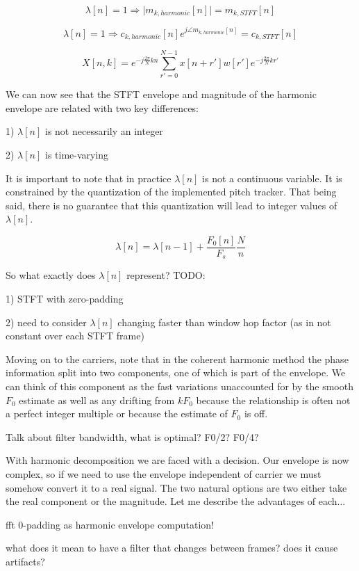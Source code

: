 \documentclass [11pt, proquest] {uwthesis}[2015/03/03]
\begin{document}
$$\lambda[n] = 1 \Rightarrow \vert m_{k,harmonic}[n] \vert = m_{k,STFT}[n]$$

$$\lambda[n] = 1 \Rightarrow c_{k,harmonic}[n]e^{j \angle m_{k,harmonic}[n]} = c_{k,STFT}[n]$$



$$X[n,k] = e^{-j\frac{2\pi}{N}kn} \sum\limits_{r'=0}^{N-1} x[n + r'] w[r'] e^{-j\frac{2\pi}{N}kr'}$$


We can now see that the STFT envelope and magnitude of the harmonic envelope are related with two key differences:

1) $\lambda[n]$ is not necessarily an integer

2) $\lambda[n]$ is time-varying

It is important to note that in practice $\lambda[n]$ is not a continuous variable.  It is constrained by the quantization of the implemented pitch tracker.  That being said, there is no guarantee that this quantization will lead to integer values of $\lambda[n]$.

$$\lambda[n] = \lambda[n-1] + \frac{F_0[n]}{F_s}  \frac{N}{n}$$

So what exactly does $\lambda[n]$ represent?  TODO: 

1) STFT with zero-padding

2) need to consider $\lambda[n]$ changing faster than window hop factor (as in not constant over each STFT frame)

Moving on to the carriers, note that in the coherent harmonic method the phase information split into two components, one of which is part of the envelope.  We can think of this component as the fast variations unaccounted for by the smooth $F_0$ estimate as well as any drifting from $kF_0$ because the relationship is often not a perfect integer multiple or because the estimate of $F_0$ is off.


Talk about filter bandwidth, what is optimal? F0/2? F0/4?


With harmonic decomposition we are faced with a decision.  Our envelope is now complex, so if we need to use the envelope independent of carrier we must somehow convert it to a real signal.  The two natural options are two either take the real component or the magnitude.  Let me describe the advantages of each...


fft 0-padding as harmonic envelope computation!

		what does it mean to have a filter that changes
		between frames?  does it cause artifacts?
\end{document}

